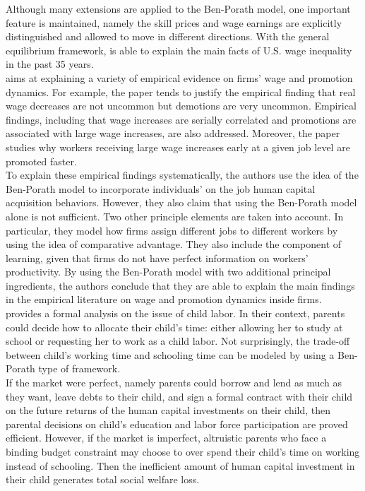 \indent Although many extensions are applied to the Ben-Porath model, one important feature is maintained, namely the skill prices and wage earnings are explicitly distinguished and allowed to move in different directions. With the general equilibrium framework, \citet{heckman1998explaining} is able to explain the main facts of U.S. wage inequality in the past 35 years.\\
\indent \citet{gibbons1999theory} aims at explaining a variety of empirical evidence on firms' wage and promotion dynamics. For example, the paper tends to justify the empirical finding that real wage decreases are not uncommon but demotions are very uncommon. Empirical findings, including that wage increases are serially correlated and promotions are associated with large wage increases, are also addressed. Moreover, the paper studies why workers receiving large wage increases early at a given job level are promoted faster.\\
\indent To explain these empirical findings systematically, the authors use the idea of the Ben-Porath model to incorporate individuals' on the job human capital acquisition behaviors. However, they also claim that using the Ben-Porath model alone is not sufficient. Two other principle elements are taken into account. In particular, they model how firms assign different jobs to different workers by using the idea of comparative advantage. They also include the component of learning, given that firms do not have perfect information on workers' productivity. By using the Ben-Porath model with two additional principal ingredients, the authors conclude that they are able to explain the main findings in the empirical literature on wage and promotion dynamics inside firms.\\
\indent \citet{baland2000child} provides a formal analysis on the issue of child labor. In their context, parents could decide how to allocate their child's time: either allowing her to study at school or requesting her to work as a child labor. Not surprisingly, the trade-off between child's working time and schooling time can be modeled by using a Ben-Porath type of framework.\\
\indent If the market were perfect, namely parents could borrow and lend as much as they want, leave debts to their child, and sign a formal contract with their child on the future returns of the human capital investments on their child, then parental decisions on child's education and labor force participation are proved efficient. However, if the market is imperfect, altruistic parents who face a binding budget constraint may choose to over spend their child's time on working instead of schooling. Then the inefficient amount of human capital investment in their child generates total social welfare loss.\\
